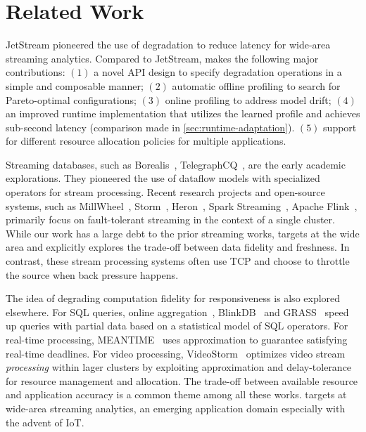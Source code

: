 \section{Related Work}
\label{sec:related-work}

 JetStream pioneered the use of degradation to reduce latency
for wide-area streaming analytics. Compared to JetStream, \sysname{} makes the
following major contributions: $(1)$ a novel API design to specify degradation
operations in a simple and composable manner; $(2)$ automatic offline profiling
to search for Pareto-optimal configurations; $(3)$ online profiling to address
model drift; $(4)$ an improved runtime implementation that utilizes the learned
profile and achieves sub-second latency (comparison made in
\autoref{sec:runtime-adaptation}). $(5)$ support for different resource
allocation policies for multiple applications.

 Streaming databases, such as
Borealis~\cite{abadi2005design},
TelegraphCQ~\cite{chandrasekaran2003telegraphcq}, are the early academic
explorations. They pioneered the use of dataflow models with specialized
operators for stream processing. Recent research projects and open-source
systems, such as MillWheel~\cite{akidau2013millwheel},
Storm~\cite{toshniwal2014storm}, Heron~\cite{sanjeev2015twitter}, Spark
Streaming~\cite{zaharia2013discretized}, Apache Flink~\cite{carbone2015apache},
primarily focus on fault-tolerant streaming in the context of a single
cluster. While our work has a large debt to the prior streaming works,
\sysname{} targets at the wide area and explicitly explores the trade-off
between data fidelity and freshness. In contrast, these stream processing
systems often use TCP and choose to throttle the source when back pressure
happens.

 The idea of degrading computation fidelity for
responsiveness is also explored elsewhere. For SQL queries, online
aggregation~\cite{hellerstein1997online}, BlinkDB~\cite{agarwal2013blinkdb} and
GRASS~\cite{ananthanarayanan2014grass} speed up queries with partial data based
on a statistical model of SQL operators. For real-time processing,
MEANTIME~\cite{farrell2016meantime} uses approximation to guarantee satisfying
real-time deadlines. For video processing, VideoStorm~\cite{zhang2017live}
optimizes video stream \textit{processing} within lager clusters by exploiting
approximation and delay-tolerance for resource management and allocation. The
trade-off between available resource and application accuracy is a common theme
among all these works. \sysname{} targets at wide-area streaming analytics, an
emerging application domain especially with the advent of IoT\@.

